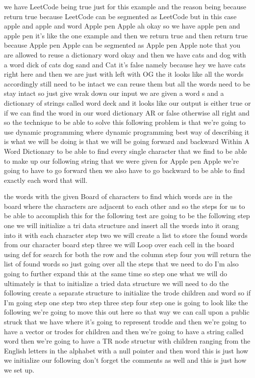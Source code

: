 \expandafter\def\csname sourceexcerpt@68\endcsname{%
we have LeetCode being true just for this example and the reason being because return
true because LeetCode can be segmented as LeetCode but in this case apple and apple
and word Apple pen Apple ah okay so we have apple pen and apple pen it's like the one
example and then we return true and then return true because Apple pen Apple can
be segmented as Apple pen Apple note that you are allowed to reuse a dictionary word
okay and then we have cats and dog with a word dick of cats dog sand and Cat it's
false namely because hey we have cats right here and then we are just with left with
OG the it looks like all the words accordingly still need to be intact we can reuse
them but all the words need to be stay intact so just give wrak down our input we are
given a word s and a dictionary of strings called word deck and it looks like our
output is either true or if we can find the word in our word dictionary AR or false
otherwise all right and so the technique to be able to solve this following problem is
that we're going to use dynamic programming where dynamic programming best way of
describing it is what we will be doing is that we will be going forward and backward
Within A Word Dictionary to be able to find every single character that we find to be
able to make up our following string that we were given for Apple pen Apple we're
going to have to go forward then we also have to go backward to be able to find
exactly each word that will.
}

\expandafter\def\csname sourceexcerpt@69\endcsname{%
the words with the given Board of characters to find which words are in the board
where the characters are adjacent to each other and so the steps for us to be able to
accomplish this for the following test are going to be the following step one we will
initialize a tri data structure and insert all the words into it orang into it with
each character step two we will create a list to store the found words from our
character board step three we will Loop over each cell in the board using def for
search for both the row and the column step four you will return the list of found
words so just going over all the steps that we need to do I'm also going to further
expand this at the same time so step one what we will do ultimately is that to
initialize a tried data structure we will need to do the following create a separate
structure to initialize the trode children and word so if I'm going step one step two
step three step four step one is going to look like the following we're going to move
this out here so that way we can call upon a public struck that we have where it's
going to represent trodde and then we're going to have a vector or trodes for children
and then we're going to have a string called word then we're going to have a TR node
structur with children ranging from the English letters in the alphabet with a null
pointer and then word this is just how we initialize our following don't forget the
comments as well and this is just how we set up.
}

